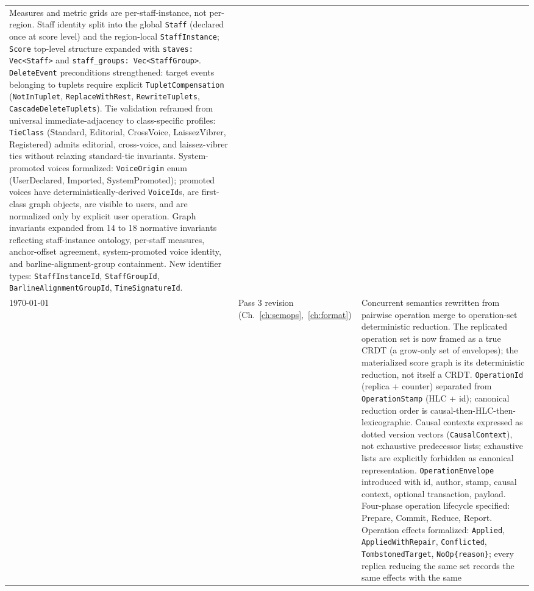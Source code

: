 \documentclass[11pt,letterpaper]{report}
\begin{document}
\begin{longtable}{p{2cm} p{2.5cm} p{9cm}}
  Measures and metric grids are per-staff-instance, not per-region.
  Staff identity split into the global \texttt{Staff} (declared once
  at score level) and the region-local \texttt{StaffInstance};
  \texttt{Score} top-level structure expanded with
  \texttt{staves: Vec<Staff>} and
  \texttt{staff\_groups: Vec<StaffGroup>}.
  \texttt{DeleteEvent} preconditions strengthened: target events
  belonging to tuplets require explicit
  \texttt{TupletCompensation} (\texttt{NotInTuplet},
  \texttt{ReplaceWithRest}, \texttt{RewriteTuplets},
  \texttt{CascadeDeleteTuplets}). Tie validation reframed from
  universal immediate-adjacency to class-specific profiles:
  \texttt{TieClass} (Standard, Editorial, CrossVoice,
  LaissezVibrer, Registered) admits editorial, cross-voice, and
  laissez-vibrer ties without relaxing standard-tie invariants.
  System-promoted voices formalized: \texttt{VoiceOrigin} enum
  (UserDeclared, Imported, SystemPromoted); promoted voices have
  deterministically-derived \texttt{VoiceId}s, are first-class
  graph objects, are visible to users, and are normalized only by
  explicit user operation. Graph invariants expanded from 14 to 18
  normative invariants reflecting staff-instance ontology,
  per-staff measures, anchor-offset agreement, system-promoted
  voice identity, and barline-alignment-group containment. New
  identifier types: \texttt{StaffInstanceId},
  \texttt{StaffGroupId}, \texttt{BarlineAlignmentGroupId},
  \texttt{TimeSignatureId}. \\
  \today & Pass 3 revision (Ch.~\ref{ch:semops},~\ref{ch:format}) &
  Concurrent semantics rewritten from pairwise operation merge to
  operation-set deterministic reduction. The replicated operation
  set is now framed as a true CRDT (a grow-only set of envelopes);
  the materialized score graph is its deterministic reduction, not
  itself a CRDT. \texttt{OperationId} (replica + counter) separated
  from \texttt{OperationStamp} (HLC + id); canonical reduction order
  is causal-then-HLC-then-lexicographic. Causal contexts expressed as
  dotted version vectors (\texttt{CausalContext}), not exhaustive
  predecessor lists; exhaustive lists are explicitly forbidden as
  canonical representation. \texttt{OperationEnvelope} introduced
  with id, author, stamp, causal context, optional transaction,
  payload. Four-phase operation lifecycle specified: Prepare,
  Commit, Reduce, Report. Operation effects formalized:
  \texttt{Applied}, \texttt{AppliedWithRepair}, \texttt{Conflicted},
  \texttt{TombstonedTarget}, \texttt{NoOp\{reason\}}; every replica
  reducing the same set records the same effects with the same

\end{longtable}
\end{document}
